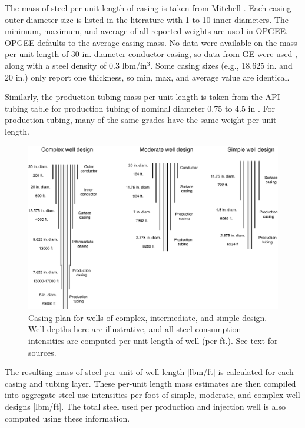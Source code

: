 \documentclass[11pt]{report}
\newcommand{\marg}[1]{{\footnotesize\textit{\textcolor{stanford}{'#1'}}}}
\newcommand{\marginnote}[1]{\marginpar{\marg{#1}}}
\begin{document}
{{{{The mass of steel per unit length of casing is taken \marginnote{Embodied Emissions 2.3.1} from Mitchell \cite[Table 7.10]{Mitchell2006}. Each casing outer-diameter size is listed in the literature with 1 to 10 inner diameters. The minimum, maximum, and average of all reported weights are used in OPGEE. OPGEE defaults to the average casing mass. No data were available on the mass per unit length of 30 in. diameter conductor casing, so data from GE were used \cite{GE2014}, along with a steel density of 0.3 lbm/in$^3$. Some casing sizes (e.g., 18.625 in. and 20 in.) only report one thickness, so min, max, and average value are identical.

Similarly, the production tubing mass per \marginnote{Embodied Emissions 2.3.2} unit length is taken from the API tubing table for production tubing of nominal diameter 0.75 to 4.5 in \cite{API2014}. For production tubing, many of the same grades have the same weight per unit length.

\begin{figure}[t]
\includegraphics[width=1\columnwidth]{images/all_well_casing.pdf}
\caption{Casing plan for wells of complex, intermediate, and simple design. Well depths here are illustrative, and all steel consumption intensities are computed per unit length of well (per ft.). See text for sources.}
\label{fig:casing_all}
\end{figure}

The resulting mass \marginnote{Embodied Emissions 2.3.3} of steel per unit of well length [lbm/ft] is calculated for each casing and tubing layer. These per-unit length mass estimates are then compiled into aggregate steel use intensities per foot of simple, moderate, and complex well designs [lbm/ft]. The total steel used per production \marginnote{Embodied Emissions 2.3.6} and injection well is also computed using these information.


}}}}
\end{document}
